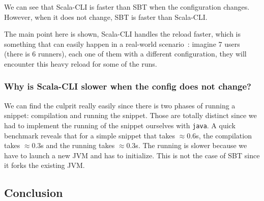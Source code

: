 \documentclass{article}
\begin{document}
\begin{table}[H]
    \centering
\end{table}

We can see that Scala-CLI is faster than SBT when the configuration changes. However, when it does not change, SBT is faster than Scala-CLI.

The main point here is shown, Scala-CLI handles the reload faster, which is something that can easily happen in a real-world scenario~: imagine 7 users (there is 6 runners), each one of them with a different configuration, they will encounter this heavy reload for some of the runs.

\subsubsection{Why is Scala-CLI slower when the config does not change?}

We can find the culprit really easily since there is two phases of running a snippet: compilation and running the snippet. Those are totally distinct since we had to implement the running of the snippet ourselves with \lstinline{java}. A quick benchmark reveals that for a simple snippet that takes $\approx 0.6$s, the compilation takes $\approx 0.3$s and the running takes $\approx 0.3$s. The running is slower because we have to launch a new JVM and has to initialize. This is not the case of SBT since it forks the existing JVM.

\subsection{Conclusion}
\end{document}
